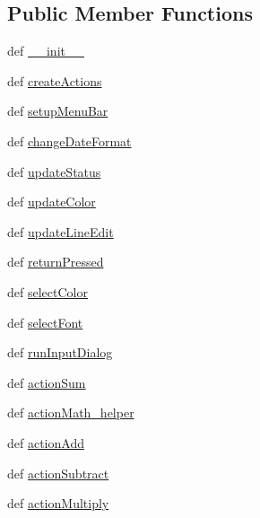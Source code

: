 \subsection*{Public Member Functions}
\begin{DoxyCompactItemize}
\item 
def \hyperlink{classspreadsheet_1_1SpreadSheet_a11a805eb8f6f86c898bf739a1121c4a7}{\+\_\+\+\_\+init\+\_\+\+\_\+}
\item 
def \hyperlink{classspreadsheet_1_1SpreadSheet_a04187a28bc0c6b134bfe726834d57c5f}{create\+Actions}
\item 
def \hyperlink{classspreadsheet_1_1SpreadSheet_a5d8194f2c478db9d6d78c72646d08877}{setup\+Menu\+Bar}
\item 
def \hyperlink{classspreadsheet_1_1SpreadSheet_aa47d6333196bcbb1a6fbfd413f81169e}{change\+Date\+Format}
\item 
def \hyperlink{classspreadsheet_1_1SpreadSheet_a148047904ac2868028db1b4539e241db}{update\+Status}
\item 
def \hyperlink{classspreadsheet_1_1SpreadSheet_a918c6b5844890dfacc608e69f7ae3f99}{update\+Color}
\item 
def \hyperlink{classspreadsheet_1_1SpreadSheet_a458ba3a96689d3c8b401085e2679db77}{update\+Line\+Edit}
\item 
def \hyperlink{classspreadsheet_1_1SpreadSheet_afaaddf7f9b6004de386058d9db4751b7}{return\+Pressed}
\item 
def \hyperlink{classspreadsheet_1_1SpreadSheet_ab717a9fa0aa09e480a11e3dab8698343}{select\+Color}
\item 
def \hyperlink{classspreadsheet_1_1SpreadSheet_aa83089fdc9ea1874fb350cb48c608eaa}{select\+Font}
\item 
def \hyperlink{classspreadsheet_1_1SpreadSheet_a9e8467e8daa700c7a2fd05b78694cb06}{run\+Input\+Dialog}
\item 
def \hyperlink{classspreadsheet_1_1SpreadSheet_a369838c0cb8a3dde9f85ee3579c3fe0a}{action\+Sum}
\item 
def \hyperlink{classspreadsheet_1_1SpreadSheet_ac71d08fadc1cbf47d5e9bc02bb28013d}{action\+Math\+\_\+helper}
\item 
def \hyperlink{classspreadsheet_1_1SpreadSheet_a207939db4cd5a6567b20b31b10096f89}{action\+Add}
\item 
def \hyperlink{classspreadsheet_1_1SpreadSheet_a5e2c4642697d2244fc0f5ecf047e8931}{action\+Subtract}
\item 
def \hyperlink{classspreadsheet_1_1SpreadSheet_acd1e228a5d8b1811fa9bb87350b88f0a}{action\+Multiply}

\end{DoxyCompactItemize}
